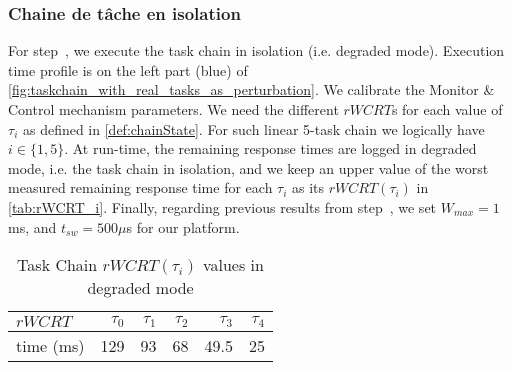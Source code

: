 \documentclass[french, a4paper, 11pt, twoside, pdftex]{StyleThese}
\begin{document}
            \subsubsection{Chaine de tâche en isolation}
                        For step~\circleTxt[5], we execute the task chain in isolation (i.e. degraded mode). Execution time profile is on the left part (blue) of \autoref{fig:taskchain_with_real_tasks_as_perturbation}.
                        We calibrate the Monitor \& Control mechanism parameters. We need the different $rWCRT$s for each value of $\tau_i$ as defined in \autoref{def:chainState}. For such linear 5-task chain we logically have $i \in \{1,5\}$. At run-time, the remaining response times are logged in degraded mode, i.e. the task chain in isolation, and we keep an upper value of the worst measured remaining response time for each $\tau_i$ as its $rWCRT(\tau_i)$ in \autoref{tab:rWCRT_i}.         Finally, regarding previous results from step~\circleTxt[3], we set $W_{max} = 1$ms, and $t_{sw} = 500\mu$s for our platform.
                
                        \begin{table}[ht]
                            \renewcommand{\arraystretch}{1}
                            \centering
                            \caption{Task Chain $rWCRT(\tau_i)$ values in degraded mode}
                            \label{tab:rWCRT_i}
                            \begin{tabular}{@{}lrrrrr@{}}
                            \toprule
                             $ rWCRT$ & $\tau_0$ & $\tau_1$ & $\tau_2$ & $\tau_3$  & $\tau_4$\\
                             \midrule
                                time (ms)         & 129     &    93   &     68  &  49.5    &   25 \\
                             \bottomrule
                            \end{tabular}
                        \end{table}
        
\end{document}
